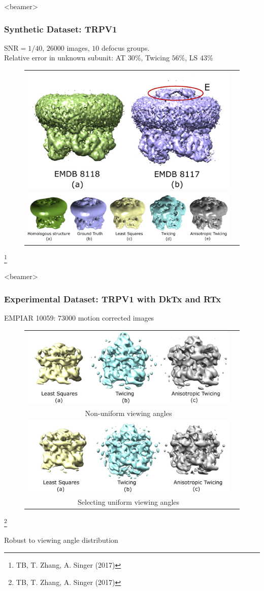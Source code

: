 \documentclass{beamer}
\newcommand\blfootnote[1]{%
  \begingroup
  \renewcommand\thefootnote{}\footnote{#1}%
  \addtocounter{footnote}{-1}%
  \endgroup
}
\begin{document}
\begin{frame}<beamer>
\frametitle{Synthetic Dataset: TRPV1 }
SNR$=1/40$, $26000$ images, $10$ defocus groups.\\ 
Relative error in unknown subunit: AT $30\%$, Twicing $56\%$, LS $43\%$ 
\begin{figure}[!htbp]
\begin{tabular}{cc}
\includegraphics[width=0.4\linewidth]{figures/sim8117_compare.pdf}\label{fig:simtrpv_emdb} \\
\includegraphics[width=0.9\linewidth]{figures/sim8117.pdf}\label{fig:simtrpv_res}\\
\end{tabular}
\end{figure}\blfootnote{TB, T. Zhang, A. Singer (2017)}

\end{frame}


\begin{frame}<beamer>
\frametitle{Experimental Dataset: TRPV1 with DkTx and RTx }
EMPIAR 10059: $73000$ motion corrected images
\begin{figure}[]
\label{fig:realtrpv}
\centering
\begin{tabular}{cc}
\includegraphics[width=0.5\linewidth]{figures/realdat_unif1.pdf} \\
Non-uniform viewing angles \\ 
\includegraphics[width=0.5\linewidth]{figures/realdat_unif0.pdf}\\
Selecting uniform viewing angles
\end{tabular}
\end{figure}\blfootnote{TB, T. Zhang, A. Singer (2017)}
\alert{Robust to viewing angle distribution}
\end{frame}
\end{document}
